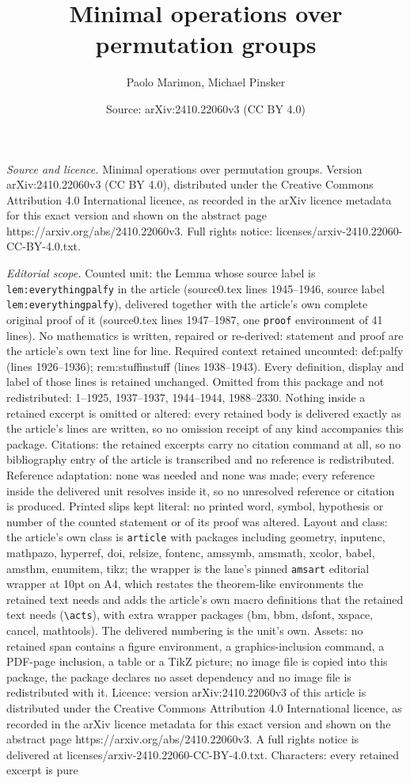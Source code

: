 \documentclass[10pt,a4paper]{amsart}
\title[Minimal operations over permutation groups]{Minimal operations over permutation groups}
\author{Paolo Marimon, Michael Pinsker}
\date{Source: arXiv:2410.22060v3 (CC BY 4.0)}
\begin{document}
\maketitle

\noindent\emph{Source and licence.} Minimal operations over permutation groups. Version arXiv:2410.22060v3 (CC BY 4.0), distributed under the Creative Commons Attribution 4.0 International licence, as recorded in the arXiv licence metadata for this exact version and shown on the abstract page https://arxiv.org/abs/2410.22060v3. Full rights notice: licenses/arxiv-2410.22060-CC-BY-4.0.txt.\par\smallskip

\noindent\textit{Editorial scope.} Counted unit: the Lemma whose source label is \texttt{lem:everythingpalfy} in the article (source0.tex lines 1945--1946, source label \texttt{lem:everythingpalfy}), delivered together with the article's own complete original proof of it (source0.tex lines 1947--1987, one \texttt{proof} environment of 41 lines). No mathematics is written, repaired or re-derived: statement and proof are the article's own text line for line. Required context retained uncounted: def:palfy (lines 1926--1936); rem:stuffinstuff (lines 1938--1943). Every definition, display and label of those lines is retained unchanged. Omitted from this package and not redistributed: 1--1925, 1937--1937, 1944--1944, 1988--2330. Nothing inside a retained excerpt is omitted or altered: every retained body is delivered exactly as the article's lines are written, so no omission receipt of any kind accompanies this package. Citations: the retained excerpts carry no citation command at all, so no bibliography entry of the article is transcribed and no reference is redistributed. Reference adaptation: none was needed and none was made; every reference inside the delivered unit resolves inside it, so no unresolved reference or citation is produced. Printed slips kept literal: no printed word, symbol, hypothesis or number of the counted statement or of its proof was altered. Layout and class: the article's own class is \texttt{article} with packages including geometry, inputenc, mathpazo, hyperref, doi, relsize, fontenc, amssymb, amsmath, xcolor, babel, amsthm, enumitem, tikz; the wrapper is the lane's pinned \texttt{amsart} editorial wrapper at 10pt on A4, which restates the theorem-like environments the retained text needs and adds the article's own macro definitions that the retained text needs (\texttt{\textbackslash acts}), with extra wrapper packages (bm, bbm, dsfont, xspace, cancel, mathtools). The delivered numbering is the unit's own. Assets: no retained span contains a figure environment, a graphics-inclusion command, a PDF-page inclusion, a table or a TikZ picture; no image file is copied into this package, the package declares no asset dependency and no image file is redistributed with it. Licence: version arXiv:2410.22060v3 of this article is distributed under the Creative Commons Attribution 4.0 International licence, as recorded in the arXiv licence metadata for this exact version and shown on the abstract page https://arxiv.org/abs/2410.22060v3. A full rights notice is delivered at licenses/arxiv-2410.22060-CC-BY-4.0.txt. Characters: every retained excerpt is pure 
\end{document}
